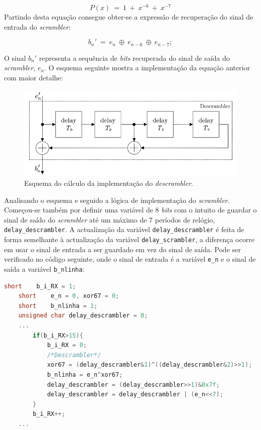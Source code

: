 \documentclass[11pt]{article}
\numberwithin{equation}{section}
\begin{document}
\begin{equation}
P(x)~= ~1~+~x^{-6}~+~x^{-7}
\end{equation}
Partindo desta equação consegue obter-se a expressão de recuperação do sinal de entrada do \textit{scrambler}:

\vspace{-3mm}
\begin{equation}
b_n'~= ~e_n~\oplus~e_{n-6}~\oplus~e_{n-7};
\end{equation}  

O sinal $b_n'$ representa a sequência de \textit{bits} recuperada do sinal de saída do \textit{scrambler}, $e_n$. O esquema seguinte mostra a implementação da equação anterior com maior detalhe:

\begin{figure}[H]
	\centering
	\includegraphics[keepaspectratio=true, scale=0.60]{teoricas/descrambler}
	\caption{Esquema do cálculo da implementação do \textit{descrambler}.}
	\vspace{-0.8em}
\end{figure}

Analisando o esquema e seguido a lógica de implementação do \textit{scrambler}. Começou-se também por definir uma variável de 8 \textit{bits} com o intuito de guardar o sinal de saído do \textit{scrambler} até um máximo de 7 períodos de relógio, \texttt{delay\_descrambler}. A actualização da variável \texttt{delay\_descrambler} é feita de forma semelhante à actualização da variável \texttt{delay\_scrambler}, a diferença ocorre em usar o sinal de entrada a ser guardado em vez do sinal de saída. Pode ser verificado no código seguinte, onde o sinal de entrada é a variável \texttt{e\_n} e o sinal de saída a variável \texttt{b\_nlinha}:
\begin{lstlisting}[language=C]
	short    b_i_RX = 1;
	short    e_n = 0, xor67 = 0;
	short    b_nlinha = 1;
	unsigned char delay_descrambler = 0;
	...
		if(b_i_RX>15){
			b_i_RX = 0;
			/*Descrambler*/
			xor67 = (delay_descrambler&1)^((delay_descrambler&2)>>1);
			b_nlinha = e_n^xor67;
			delay_descrambler = (delay_descrambler>>1)&0x7f;
			delay_descrambler = delay_descrambler | (e_n<<7);
		}
		b_i_RX++;
	...
\end{lstlisting}
\end{document}
